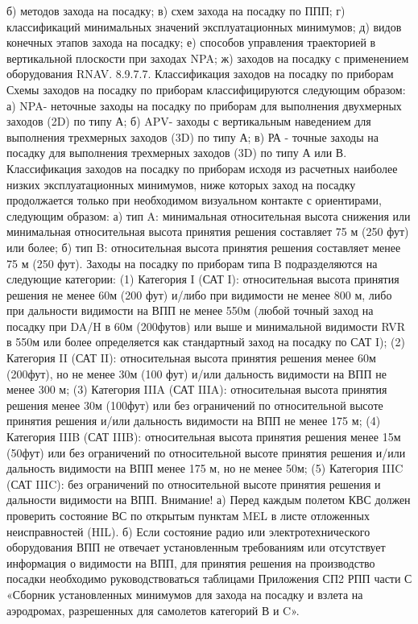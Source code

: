 б)	методов захода на посадку;
в)	схем захода на посадку по ППП;
г)	классификаций минимальных значений эксплуатационных минимумов;
д)	видов конечных этапов захода на посадку;
е)	способов управления траекторией в вертикальной плоскости при заходах NPA;
ж)	заходов на посадку с применением оборудования RNAV.
8.9.7.7.	Классификация заходов на посадку по приборам
Схемы заходов на посадку по приборам классифицируются следующим образом:
а)	NPA- неточные заходы на посадку по приборам для выполнения двухмерных заходов (2D) по типу А;
б)	APV- заходы с вертикальным наведением для выполнения трехмерных заходов (3D) по типу А;
в)	РА - точные заходы на посадку для выполнения трехмерных заходов (3D) по типу А или В.
Классификация заходов на посадку по приборам исходя из расчетных наиболее низких эксплуатационных минимумов, ниже которых заход на посадку продолжается только при необходимом визуальном контакте с ориентирами, следующим образом:
а)	тип A: минимальная относительная высота снижения или минимальная относительная высота принятия решения составляет 75 м (250 фут) или более;
б)	тип B: относительная высота принятия решения составляет менее 75 м (250 фут). Заходы на посадку по приборам типа B подразделяются на следующие категории:
(1) Категория I (САТ I): относительная высота принятия решения не менее 60м (200 фут) и/либо при видимости не менее 800 м, либо при дальности видимости на ВПП не менее 550м (любой точный заход на посадку при DA/H в 60м (200футов) или выше и минимальной видимости RVR в 550м или более определяется как стандартный заход на посадку по САТ I);
(2) Категория II (САТ II): относительная высота принятия решения менее 60м (200фут), но не менее 30м (100 фут) и/или дальность видимости на ВПП не менее 300 м;
(3) Категория IIIA (САТ IIIA): относительная высота принятия решения менее 30м (100фут) или без ограничений по относительной высоте принятия решения и/или дальность видимости на ВПП не менее 175 м;
(4) Категория IIIB (САТ IIIB): относительная высота принятия решения менее 15м (50фут) или без ограничений по относительной высоте принятия решения и/или дальность видимости на ВПП менее 175 м, но не менее 50м;
(5) Категория IIIC (САТ IIIC): без ограничений по относительной высоте принятия решения и дальности видимости на ВПП.
Внимание!
а)	Перед каждым полетом КВС должен проверить состояние ВС по открытым пунктам MEL в листе отложенных неисправностей (HIL).
б)	Если состояние радио или электротехнического оборудования ВПП не отвечает установленным требованиям или отсутствует информация о видимости на ВПП, для принятия решения на производство посадки необходимо руководствоваться таблицами Приложения СП2 РПП части С «Сборник установленных минимумов для захода на посадку и взлета на аэродромах, разрешенных для самолетов категорий В и C». 
